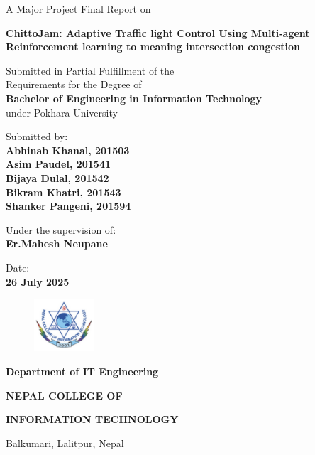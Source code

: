 \documentclass[12pt, a4paper]{report}
\begin{document}
\begin{titlepage}
	\begin{center}
	
	\large%
	A Major Project Final Report on
	
	\vfill 
	\LARGE %
	\textbf{ChittoJam: Adaptive Traffic light Control Using Multi-agent Reinforcement learning to meaning intersection congestion}

	\vfill
	
	\large %
	Submitted in Partial Fulfillment of the \\ 
	Requirements for the Degree of \\ 
	\textbf {Bachelor of Engineering in Information Technology} \\
	under Pokhara University
	
	\vfill
	
	Submitted by: \\ 
	\textbf {Abhinab Khanal, 201503} \\
	\textbf {Asim Paudel, 201541} \\
	\textbf {Bijaya Dulal, 201542} \\
	\textbf {Bikram Khatri, 201543} \\
	\textbf {Shanker Pangeni, 201594} \\
	
	\vfill
	
	Under the supervision of: \\
	\textbf {Er.Mahesh Neupane}
	
	\vfill
	
	Date: \\
	\textbf {26 July 2025}
	
	\vfill
	
	\end{center}
	
	\begin{figure}
	\centering
	\includegraphics[width=0.2\textwidth]{college-logo}
	\end{figure}
	
	\selectfont
	
	\textbf {Department of IT Engineering}  
	
	\Large %
	\textbf {NEPAL COLLEGE OF} 
	
	\LARGE %
	\textbf {\underline {INFORMATION TECHNOLOGY} }
	
	\small %
	Balkumari, Lalitpur, Nepal
	
	
\end{titlepage}
\end{document}
